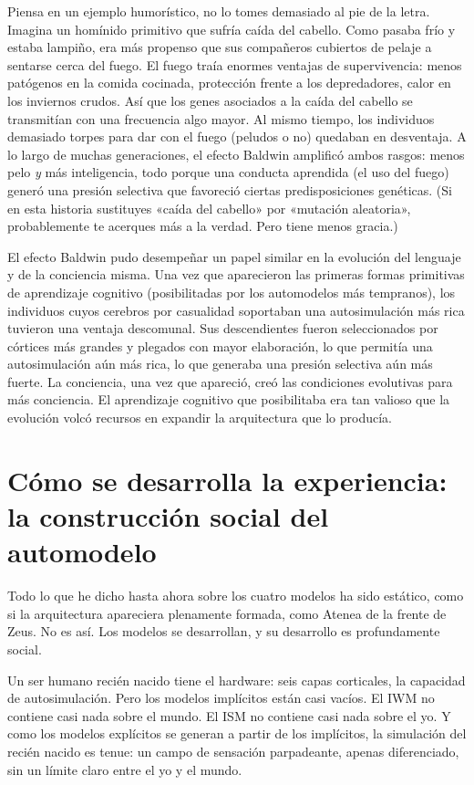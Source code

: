 \documentclass[11pt, twoside, openright]{book}
\begin{document}
Piensa en un ejemplo humorístico, no lo tomes demasiado al pie de la letra. Imagina un homínido primitivo que sufría caída del cabello. Como pasaba frío y estaba lampiño, era más propenso que sus compañeros cubiertos de pelaje a sentarse cerca del fuego. El fuego traía enormes ventajas de supervivencia: menos patógenos en la comida cocinada, protección frente a los depredadores, calor en los inviernos crudos. Así que los genes asociados a la caída del cabello se transmitían con una frecuencia algo mayor. Al mismo tiempo, los individuos demasiado torpes para dar con el fuego (peludos o no) quedaban en desventaja. A lo largo de muchas generaciones, el efecto Baldwin amplificó ambos rasgos: menos pelo \textit{y} más inteligencia, todo porque una conducta aprendida (el uso del fuego) generó una presión selectiva que favoreció ciertas predisposiciones genéticas. (Si en esta historia sustituyes «caída del cabello» por «mutación aleatoria», probablemente te acerques más a la verdad. Pero tiene menos gracia.)

El efecto Baldwin pudo desempeñar un papel similar en la evolución del lenguaje y de la conciencia misma. Una vez que aparecieron las primeras formas primitivas de aprendizaje cognitivo (posibilitadas por los automodelos más tempranos), los individuos cuyos cerebros por casualidad soportaban una autosimulación más rica tuvieron una ventaja descomunal. Sus descendientes fueron seleccionados por córtices más grandes y plegados con mayor elaboración, lo que permitía una autosimulación aún más rica, lo que generaba una presión selectiva aún más fuerte. La conciencia, una vez que apareció, creó las condiciones evolutivas para más conciencia. El aprendizaje cognitivo que posibilitaba era tan valioso que la evolución volcó recursos en expandir la arquitectura que lo producía.

\section*{Cómo se desarrolla la experiencia: la construcción social del automodelo}

Todo lo que he dicho hasta ahora sobre los cuatro modelos ha sido estático, como si la arquitectura apareciera plenamente formada, como Atenea de la frente de Zeus. No es así. Los modelos se desarrollan, y su desarrollo es profundamente social.

Un ser humano recién nacido tiene el hardware: seis capas corticales, la capacidad de autosimulación. Pero los modelos implícitos están casi vacíos. El IWM no contiene casi nada sobre el mundo. El ISM no contiene casi nada sobre el yo. Y como los modelos explícitos se generan a partir de los implícitos, la simulación del recién nacido es tenue: un campo de sensación parpadeante, apenas diferenciado, sin un límite claro entre el yo y el mundo.
\end{document}
